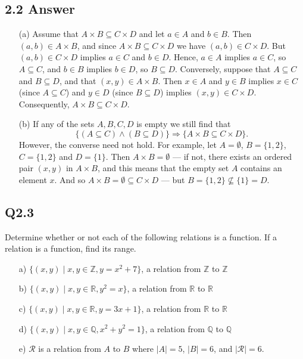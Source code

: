 \documentclass{article}
\begin{document}
\subsection*{2.2 Answer}
\begin{enumerate}
    \item[(a)] Assume that \( A \times B \subseteq C \times D \) and let \( a \in A \) and \( b \in B \). Then \( (a, b) \in A \times B \), and since \( A \times B \subseteq C \times D \) we have \( (a, b) \in C \times D \). But \( (a, b) \in C \times D \) implies \( a \in C \) and \( b \in D \). Hence, \( a \in A \) implies \( a \in C \), so \( A \subseteq C \), and \( b \in B \) implies \( b \in D \), so \( B \subseteq D \).
    Conversely, suppose that \( A \subseteq C \) and \( B \subseteq D \), and that \( (x, y) \in A \times B \). Then \( x \in A \) and \( y \in B \) implies \( x \in C \) (since \( A \subseteq C \)) and \( y \in D \) (since \( B \subseteq D \)) implies \( (x, y) \in C \times D \). Consequently, \( A \times B \subseteq C \times D \).
    \item[(b)] If any of the sets \( A, B, C, D \) is empty we still find that
    \[
    \{ (A \subseteq C) \land (B \subseteq D) \} \Rightarrow \{ A \times B \subseteq C \times D \}.
    \]
    However, the converse need not hold. For example, let \( A = \emptyset \), \( B = \{1, 2\} \), \( C = \{1, 2\} \) and \( D = \{1\} \). Then \( A \times B = \emptyset \) --- if not, there exists an ordered pair \( (x, y) \) in \( A \times B \), and this means that the empty set \( A \) contains an element \( x \). And so \( A \times B = \emptyset \subseteq C \times D \) --- but \( B = \{1, 2\} \not\subseteq \{1\} = D \).
\end{enumerate}
\newpage
\subsection*{Q2.3}
 Determine whether or not each of the following relations is a function. If a relation is a function, find its range.

\begin{enumerate}
    \item[a)] \( \{ (x, y) \mid x, y \in \mathbb{Z}, y = x^2 + 7 \} \), a relation from \(\mathbb{Z}\) to \(\mathbb{Z}\)
    \item[b)] \( \{ (x, y) \mid x, y \in \mathbb{R}, y^2 = x \} \), a relation from \(\mathbb{R}\) to \(\mathbb{R}\)
    \item[c)] \( \{ (x, y) \mid x, y \in \mathbb{R}, y = 3x + 1 \} \), a relation from \(\mathbb{R}\) to \(\mathbb{R}\)
    \item[d)] \( \{ (x, y) \mid x, y \in \mathbb{Q}, x^2 + y^2 = 1 \} \), a relation from \(\mathbb{Q}\) to \(\mathbb{Q}\)
    \item[e)] \( \mathcal{R} \) is a relation from \( A \) to \( B \) where \( |A| = 5 \), \( |B| = 6 \), and \( |\mathcal{R}| = 6 \).
\end{enumerate}
\newpage
\end{document}
